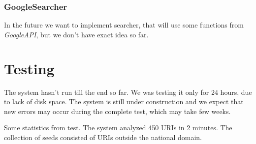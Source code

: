 \documentclass[11pt,a4paper]{article}
\begin{document}
\subsubsection*{GoogleSearcher}
In the future we want to implement searcher, that will use some functions from \emph{GoogleAPI}, but we don't have exact idea so far.


\newpage
\section{Testing}

The system hasn't run till the end so far. We was testing it only for 24 hours, due to lack of disk space. The system is still under construction and we expect that new errors may occur during the complete test, which may take few weeks.

Some statistics from test. The system analyzed 450 URIs in 2 minutes. The collection of seeds consisted of URIs outside the national domain.
\end{document}
